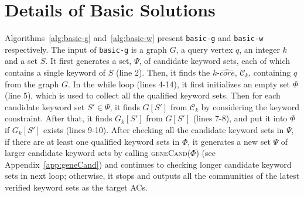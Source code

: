 \section{Details of Basic Solutions}
\label{app:basic}

Algorithms~\ref{alg:basic-g} and~\ref{alg:basic-w} present {\tt basic-g} and {\tt basic-w} respectively.
The input of {\tt basic-g} is a graph $G$, a query vertex $q$, an integer $k$ and a set $S$.
It first generates a set, $\Psi$, of candidate keyword sets,
each of which contains a single keyword of $S$ (line 2).
Then, it finds the $k$-$\widehat {core}$, ${\mathcal C}_k$, containing $q$ from the graph $G$.
In the while loop (lines 4-14), it first initializes an empty set $\Phi$ (line 5),
which is used to collect all the qualified keyword sets.
Then for each candidate keyword set $S'\in \Psi$,
it finds $G[S']$ from ${\mathcal C}_k$ by considering the keyword constraint.
After that, it finds $G_k[S']$ from $G[S']$ (lines 7-8),
and put it into $\Phi$ if $G_k[S']$ exists (lines 9-10).
After checking all the candidate keyword sets in $\Psi$,
if there are at least one qualified keyword sets in $\Phi$,
it generates a new set $\Psi$ of larger candidate keyword sets
by calling \textsc{geneCand($\Phi$)} (see Appendix~\ref{app:geneCand})
and continues to checking longer candidate keyword sets in next loop;
otherwise, it stops and outputs all the communities of the latest verified keyword sets as the target ACs.



